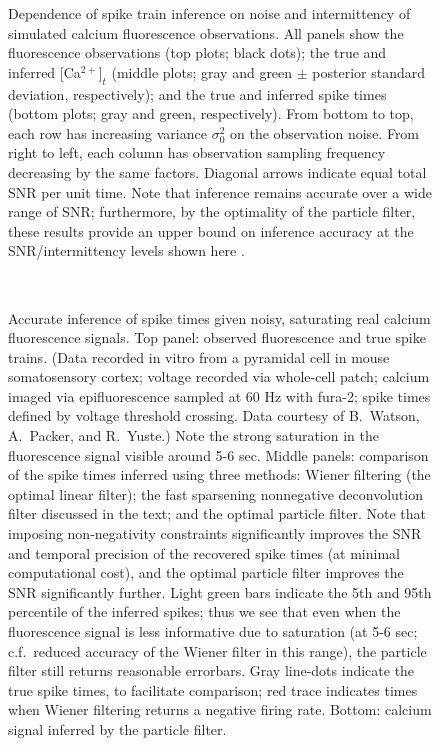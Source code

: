 \documentclass[12pt]{article}
\newcommand{\Cat}{[Ca\ensuremath{^{2+}]_t} }
\begin{document}
\begin{figure}[b!]
\begin{center}
\epsfxsize=6in 
\caption{\small Dependence of spike train inference on noise and
  intermittency of simulated calcium fluorescence observations.  All
  panels show the fluorescence observations (top plots; black dots);
  the true and inferred \Cat (middle plots; gray and green $\pm$
  posterior standard deviation, respectively); and the true and
  inferred spike times (bottom plots; gray and green, respectively).
  From bottom to top, each row has increasing variance $\sigma^2_0$ on
  the observation noise.  From right to left, each column has
  observation sampling frequency decreasing by the same factors.
  Diagonal arrows indicate equal total SNR per unit time.  Note that
  inference remains accurate over a wide range of SNR; furthermore, by
  the optimality of the particle filter, these results provide an
  upper bound on inference accuracy at the SNR/intermittency levels
  shown here \cite{Vogelstein07}.}
  \label{fig:array}
\end{center}
\end{figure}

\begin{figure}[p]
\begin{center}
\hbox{
\hspace{-1cm}
\epsfxsize=7in
}
\caption{\small Accurate inference of spike times given noisy,
  saturating real calcium fluorescence signals.  Top panel: observed
  fluorescence and true spike trains.  (Data recorded in vitro from a
  pyramidal cell in mouse somatosensory cortex; voltage recorded via
  whole-cell patch; calcium imaged via epifluorescence sampled at 60
  Hz with fura-2; spike times defined by voltage threshold crossing.
  Data courtesy of B.\ Watson, A.\ Packer, and R.\ Yuste.)  Note the
  strong saturation in the fluorescence signal visible around 5-6 sec.
  Middle panels: comparison of the spike times inferred using three
  methods: Wiener filtering (the optimal linear filter); the fast
  sparsening nonnegative deconvolution filter discussed in the text;
  and the optimal particle filter.  Note that imposing non-negativity
  constraints significantly improves the SNR and temporal precision of
  the recovered spike times (at minimal computational cost), and the
  optimal particle filter improves the SNR significantly further.
  Light green bars indicate the 5th and 95th percentile of the
  inferred spikes; thus we see that even when the fluorescence signal
  is less informative due to saturation (at 5-6 sec; c.f.\ reduced
  accuracy of the Wiener filter in this range), the particle filter
  still returns reasonable errorbars.  Gray line-dots indicate the
  true spike times, to facilitate comparison; red trace indicates
  times when Wiener filtering returns a negative firing rate.  Bottom:
  calcium signal inferred by the particle filter.}
\label{fig:jv-real}
\end{center}
\end{figure}
\end{document}
